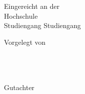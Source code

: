 \begin{titlepage}
\begin{center}
\vspace{1em}

Eingereicht an der \\
Hochschule\\
Studiengang Studiengang

\vspace{1em}

Vorgelegt von\\
\myauthor \\
\myid \\
\myemail \\

\vspace{1em}

Gutachter \\
\mytutor

\vspace{1.5em}

\mydate


\end{center}
\end{titlepage}